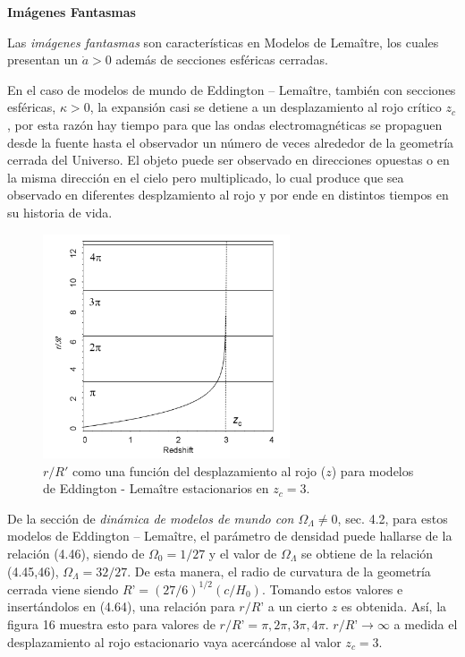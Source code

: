 \documentclass[11pt]{article}
\begin{document}
    
{\bf{\large{Imágenes Fantasmas}}}

Las {\textit{imágenes fantasmas}} son características en Modelos de Lema\^itre, los cuales presentan un $\dot{a} > 0$ además de secciones esféricas cerradas.

En el caso de modelos de mundo de Eddington – Lema\^itre, también con secciones esféricas, $\kappa >0$, la expansión casi se detiene a un desplazamiento al rojo crítico $z_c$, por esta razón hay tiempo para que las ondas electromagnéticas se propaguen desde la fuente hasta el observador un número de veces alrededor de la geometría cerrada del Universo. El objeto puede ser observado en direcciones opuestas o en la misma dirección en el cielo pero multiplicado, lo cual produce que sea observado en diferentes desplzamiento al rojo y por ende en distintos tiempos en su historia de vida.
    
    \begin{figure}                  \includegraphics[width=0.65\textwidth]{710_Malcolmpp238.png}
        \caption{\footnotesize{$r/R'$ como una función del desplazamiento al rojo ($z$) para modelos de Eddington - Lema\^itre estacionarios en $z_c = 3$.}}
    \end{figure}

    De la sección de {\textit{dinámica de modelos de mundo con $\Omega_{\Lambda} \neq 0$}}, sec. 4.2, para estos modelos de  Eddington – Lema\^itre, el parámetro de densidad puede hallarse de la relación (4.46), siendo de $\Omega_0 = 1/27$ y el valor de $\Omega_{\Lambda}$ se obtiene de la relación (4.45,46), $\Omega_{\Lambda} = 32/27$. De esta manera, el radio de curvatura de la geometría cerrada viene siendo $R’ = (27/6)^{1/2} (c/H_0)$. Tomando estos valores e insertándolos en (4.64), una relación para $r/R’$ a un cierto $z$ es obtenida. Así, la figura 16 muestra esto para valores de $r/R’ = \pi, 2 \pi, 3 \pi, 4 \pi$. $r/R’ \rightarrow{\infty}$ a medida el desplazamiento al rojo estacionario vaya acercándose al valor $z_c=3$. 
    
\end{document}
